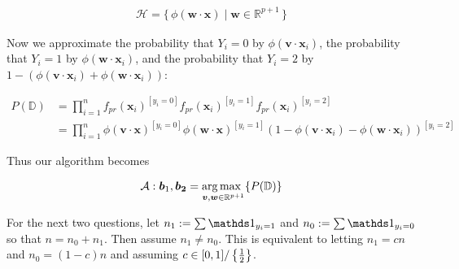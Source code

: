 \documentclass[12pt]{article}
\begin{document}
\begin{enumerate}
\begin{align*}
	\mathcal{H} = \{\,
	\phi(\bm{w}\cdot \bm{x}) \mid \bm{w}\in \mathbb{R}^{p+1}
	\,\}
\end{align*}

Now we approximate the probability that $Y_i = 0$
by $\phi(\bm{v}\cdot \bm{x}_i)$, the probability that $Y_i=1$ by
$\phi(\bm{w}\cdot \bm{x}_i)$, and the probability that $Y_i=2$ by
$1 - (\phi(\bm{v}\cdot\bm{x}_i) + \phi(\bm{w}\cdot\bm{x}_i))$:

\begin{align*}
	P(\mathbb{D})
	&=\prod_{i=1}^{n} f_{pr}(\bm{x}_i)^{[y_i = 0]}f_{pr}(\bm{x}_i)^{[y_i = 1]}f_{pr}(\bm{x}_i)^{[y_i = 2]}\\
	&=\prod_{i=1}^{n}\phi(\bm{v}\cdot\bm{x})^{[y_i = 0]}\phi(\bm{w}\cdot\bm{x})^{[y_i=1]}
	\left(1 - \phi(\bm{v} \cdot \bm{x}_i) - \phi(\bm{w}\cdot\bm{x}_i)\right)^{[y_i=2]}
\end{align*}

Thus our algorithm becomes

\begin{align*}
	\mathcal{A}: \bm{b}_1,\bm{b_2}
	= \underset{\bm{v},\bm{w}\in\mathbb{R}^{p+1}}{\operatorname*{arg\,max~}}\{P(\mathbb{D})\}
\end{align*}

\pagebreak

For the next two questions, let $n_1 := \sum \indic{y_i = 1}$ and $n_0 := \sum \indic{y_i = 0}$ so that $n = n_0 + n_1$. Then assume $n_1 \neq n_0$. This is equivalent to letting $n_1 = cn$ and $n_0 = (1-c)n$ and assuming $c \in [0,1]/\left\{\frac{1}{2}\right\}$.




\end{enumerate}

\pagebreak
{}
\end{document}

